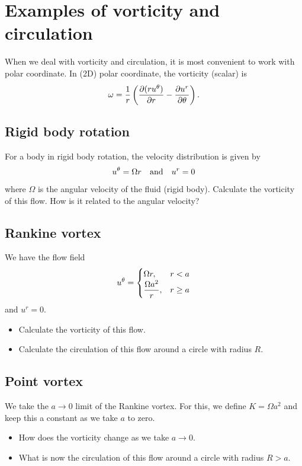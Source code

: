\documentclass[11pt,letterpaper]{report}
\begin{document}
\section{Examples of vorticity and circulation}
When we deal with vorticity and circulation, it is most convenient to work with polar coordinate. In (2D) polar coordinate, the vorticity (scalar) is
\begin{align}
    \omega = \frac{1}{r}\left( \frac{\partial (ru^\theta)}{\partial r}-\frac{\partial u^r}{\partial \theta} \right).
\end{align}

\subsection{Rigid body rotation}
For a body in rigid body rotation, the velocity distribution is given by
\begin{align}
    u^\theta = \Omega r \quad \mbox{and} \quad u^r = 0
\end{align}
where $\Omega$ is the angular velocity of the fluid (rigid body). Calculate the vorticity of this flow. How is it related to the angular velocity?

\subsection{Rankine vortex}
We have the flow field
\begin{align}
    u^\theta = \begin{cases}
        \Omega r, & r<a\\
        \displaystyle{\frac{\Omega a^2}{r}}, & r\geq a
    \end{cases}
\end{align}
and $u^r = 0$. 
\begin{itemize}
    \item Calculate the vorticity of this flow.
    \item Calculate the circulation of this flow around a circle with radius $R$.
\end{itemize}

\subsection{Point vortex}
We take the $a\to 0$ limit of the Rankine vortex. For this, we define $K = \Omega a^2$ and keep this a constant as we take $a$ to zero. 
\begin{itemize}
    \item How does the vorticity change as we take $a\to 0$.
    \item What is now the circulation of this flow around a circle with radius $R>a$.
\end{itemize}
\end{document}
